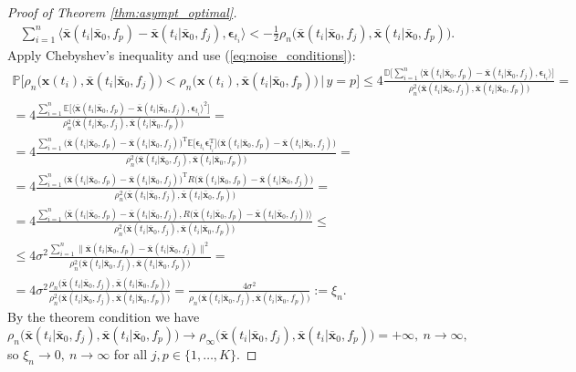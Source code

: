 \documentclass[referee, pdflatex, sn-mathphys-num]{sn-jnl}
\theoremstyle{definition}
\theoremstyle{plain}
\newcommand{\bx}{\ensuremath{\mathbf{x}}}
\newcommand{\bbx}{\ensuremath{\bar{\mathbf{x}}}}
\newcommand{\beps}{\ensuremath{\boldsymbol{\epsilon}}}
\begin{document}
\begin{appendices}
\begin{proof}[Proof of Theorem \ref{thm:asympt_optimal}]
\begin{gather*}
				\sum\limits_{i=1}^n \langle \bbx(t_i | \bbx_0, f_p) - \bbx(t_i | \bbx_0, f_j) , \beps_{t_i} \rangle < - \frac{1}{2} \rho_{n} \big( \bbx(t_i | \bbx_0, f_j), \bbx(t_i | \bbx_0, f_p) \big).
			\end{gather*}
			Apply Chebyshev's inequality and use (\ref{eq:noise_conditions}):
			\begin{multline*}
				\mathbb{P}\big[ \rho_n\big( \bx(t_i), \bbx(t_i | \bbx_0, f_j) \big) < \rho_n\big( \bx(t_i), \bbx(t_i | \bbx_0, f_p) \big) \,\big|\, y = p \big] \le 4 \frac{\mathbb{D}\big[ \sum\limits_{i=1}^n \langle \bbx(t_i | \bbx_0, f_p) - \bbx(t_i | \bbx_0, f_j) , \beps_{t_i} \rangle \big]}{\rho^2_{n} \big( \bbx(t_i | \bbx_0, f_j), \bbx(t_i | \bbx_0, f_p) \big)} = \\ = 4 \frac{\sum\limits_{i=1}^n \mathbb{E} \big[ \langle \bbx(t_i | \bbx_0, f_p) - \bbx(t_i | \bbx_0, f_j) , \beps_{t_i} \rangle^2 \big]}{\rho^2_{n} \big( \bbx(t_i | \bbx_0, f_j), \bbx(t_i | \bbx_0, f_p) \big)} = \\ = 4 \frac{\sum\limits_{i=1}^n \big( \bbx(t_i | \bbx_0, f_p) - \bbx(t_i | \bbx_0, f_j) \big)^{\text{T}} \mathbb{E} \big[ \beps_{t_i} \beps_{t_i}^{\text{T}} \big] \big( \bbx(t_i | \bbx_0, f_p) - \bbx(t_i | \bbx_0, f_j) \big)}{\rho^2_{n} \big( \bbx(t_i | \bbx_0, f_j), \bbx(t_i | \bbx_0, f_p) \big)} = \\ = 4 \frac{\sum\limits_{i=1}^n \big( \bbx(t_i | \bbx_0, f_p) - \bbx(t_i | \bbx_0, f_j) \big)^{\text{T}} R \big( \bbx(t_i | \bbx_0, f_p) - \bbx(t_i | \bbx_0, f_j) \big)}{\rho^2_{n} \big( \bbx(t_i | \bbx_0, f_j), \bbx(t_i | \bbx_0, f_p) \big)} = \\ = 4 \frac{\sum\limits_{i=1}^n \langle \bbx(t_i | \bbx_0, f_p) - \bbx(t_i | \bbx_0, f_j), R \big( \bbx(t_i | \bbx_0, f_p) - \bbx(t_i | \bbx_0, f_j) \big) \rangle}{\rho^2_{n} \big( \bbx(t_i | \bbx_0, f_j), \bbx(t_i | \bbx_0, f_p) \big)} \le \\ \le 4 \sigma^2 \frac{\sum\limits_{i=1}^n \lVert \bbx(t_i | \bbx_0, f_p) - \bbx(t_i | \bbx_0, f_j) \rVert^2}{\rho^2_{n} \big( \bbx(t_i | \bbx_0, f_j), \bbx(t_i | \bbx_0, f_p) \big)} = \\ = 4 \sigma^2 \frac{\rho_{n} \big( \bbx(t_i | \bbx_0, f_j), \bbx(t_i | \bbx_0, f_p) \big)}{\rho^2_{n} \big( \bbx(t_i | \bbx_0, f_j), \bbx(t_i | \bbx_0, f_p) \big)} = \frac{4 \sigma^2}{\rho_{n} \big( \bbx(t_i | \bbx_0, f_j), \bbx(t_i | \bbx_0, f_p) \big)} := \xi_n.
			\end{multline*}
			By the theorem condition we have
			\begin{equation*}
				\rho_{n} \big( \bbx(t_i | \bbx_0, f_j), \bbx(t_i | \bbx_0, f_p) \big) \to \rho_{\infty} \big( \bbx(t_i | \bbx_0, f_j), \bbx(t_i | \bbx_0, f_p) \big) = +\infty, \  n \to \infty,
			\end{equation*}
			so $\xi_n \to 0, \ n \to \infty$ for all $j,p \in \{1, \ldots, K\}$.
			

\end{proof}
\end{appendices}
\end{document}
